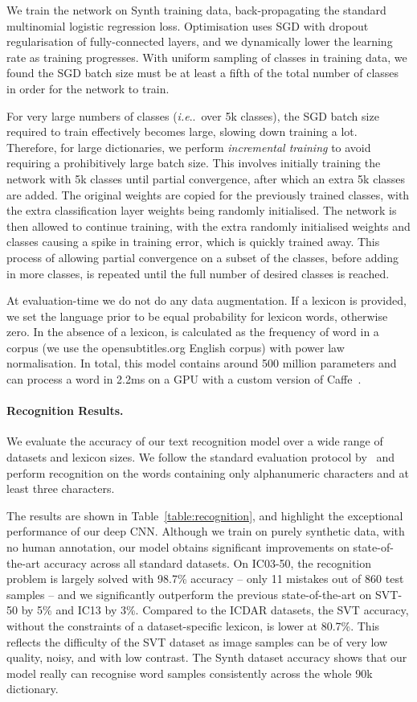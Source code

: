 \documentclass[twocolumn]{svjour3}          \smartqed  \usepackage{epsfig}
\makeatletter
\DeclareRobustCommand\onedot{\futurelet\@let@token\@onedot}
\def\@onedot{\ifx\@let@token.\else.\null\fi\xspace}
\def\ie{\emph{i.e}\onedot} \def\Ie{\emph{I.e}\onedot}
\makeatother
\begin{document}
We train the network on Synth training data, back-propagating the standard multinomial logistic regression loss. Optimisation uses SGD with dropout regularisation of fully-connected layers, and we dynamically lower the learning rate as training progresses. With uniform sampling of classes in training data, we found the SGD batch size must be at least a fifth of the total number of classes in order for the network to train. 

For very large numbers of classes (\ie~over 5k classes), the SGD batch size required to train effectively becomes large, slowing down training a lot. Therefore, for large dictionaries, we perform \emph{incremental training} to avoid requiring a prohibitively large batch size. This involves initially training the network with 5k classes until partial convergence, after which an extra 5k classes are added. The original weights are copied for the previously trained classes, with the extra classification layer weights being randomly initialised. The network is then allowed to continue training, with the extra randomly initialised weights and classes causing a spike in training error, which is quickly trained away. This process of allowing partial convergence on a subset of the classes, before adding in more classes, is repeated until the full number of desired classes is reached.

At evaluation-time we do not do any data augmentation. If a lexicon is provided, we set the language prior  to be equal probability for lexicon words, otherwise zero. In the absence of a lexicon,  is calculated as the frequency of word  in a corpus (we use the opensubtitles.org English corpus) with power law normalisation. In total, this model contains around 500 million parameters and can process a word in 2.2ms on a GPU with a custom version of Caffe~\cite{Jia13}.

\paragraph{Recognition Results.}
We evaluate the accuracy of our text recognition model over a wide range of datasets and lexicon sizes. We follow the standard evaluation protocol by~\cite{Wang11} and perform recognition on the words containing only alphanumeric characters and at least three characters.

The results are shown in Table~\ref{table:recognition}, and highlight the exceptional performance of our deep CNN. Although we train on purely synthetic data, with no human annotation, our model obtains significant improvements on state-of-the-art accuracy across all standard datasets. On IC03-50, the recognition problem is largely solved with 98.7\% accuracy -- only 11 mistakes out of 860 test samples -- and we significantly outperform the previous state-of-the-art \cite{Bissacco13} on SVT-50 by 5\% and IC13 by 3\%. Compared to the ICDAR datasets, the SVT accuracy, without the constraints of a dataset-specific lexicon, is lower at 80.7\%. This reflects the difficulty of the SVT dataset as image samples can be of very low quality, noisy, and with low contrast. The Synth dataset accuracy shows that our model really can recognise word samples consistently across the whole 90k dictionary.
\end{document}
